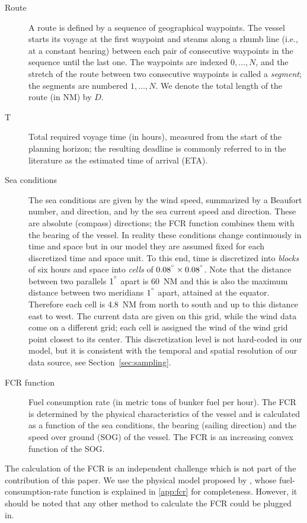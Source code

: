 \documentclass[review,authoryear]{elsarticle}
\begin{document}
\begin{description}
	\item[Route] A route is defined by a sequence of geographical waypoints. The vessel starts its voyage at the first waypoint and steams along a rhumb line (i.e., at a constant bearing) between each pair of consecutive waypoints in the sequence until the last one.  The waypoints are indexed $0,\ldots, N$, and the stretch of the route between two consecutive waypoints is called a \emph{segment}; the segments are numbered $1,\ldots, N$. We denote the total length of the route (in NM) by $D$.
	\item[T]  Total required voyage time (in hours), measured from the start of the planning horizon; the resulting deadline is commonly referred to in the literature as the estimated time of arrival (ETA).
	\item [Sea conditions]    The sea conditions are given by the wind speed, summarized by a Beaufort number, and direction, and by the sea current speed and direction. These are absolute (compass) directions; the FCR function combines them with the bearing of the vessel. In reality these conditions change continuously in time and space but in our model they are assumed fixed for each discretized time and space unit. To this end, time is discretized into \emph{blocks} of six hours and space into \emph{cells} of $0.08^{\degree} \times 0.08^{\degree}$.  Note that the distance between two parallels $1^{\degree}$ apart is 60~NM and this is also the maximum distance between two meridians $1^{\degree}$ apart, attained at the equator.  Therefore each cell is 4.8~NM from north to south and up to this distance east to west. The current data are given on this grid, while the wind data come on a different grid; each cell is assigned the wind of the wind grid point closest to its center.
  This discretization level is not hard-coded in our model, but it is consistent with the temporal and spatial resolution of  our data source, see Section~\ref{sec:sampling}.
	\item[FCR function]   Fuel consumption rate (in metric tons of bunker fuel per hour). The FCR is determined by the physical characteristics of the vessel and is calculated as a function of the sea conditions, the bearing (sailing direction)  and the speed over ground (SOG)  of the vessel.   The FCR is an increasing convex function of the SOG. 
\end{description}


The calculation of the FCR is an independent challenge which is not part of the contribution of this paper. We use the physical model proposed by \citet{yang2020}, whose fuel-consumption-rate function is explained in \ref{app:fcr} for completeness. However, it should be noted that any other method to calculate the FCR could be plugged in. 
\end{document}
